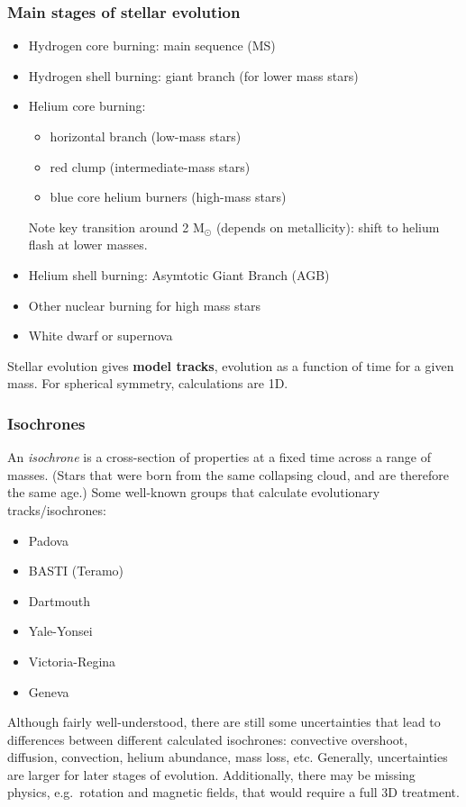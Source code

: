 \documentclass{article}
\newcommand{\mynotes}[1]{\textcolor{cadmiumorange}{#1}}
\begin{document}
\subsubsection{Main stages of stellar evolution}
\begin{itemize}
    \item Hydrogen core burning: main sequence (MS)
    \item Hydrogen shell burning: giant branch (for lower mass
        stars)
    \item Helium core burning:
        \begin{itemize}
            \item horizontal branch (low-mass stars)
            \item red clump (intermediate-mass stars)
            \item blue core helium burners (high-mass stars)
        \end{itemize}
        Note key transition around 2 M$_{\odot}$
        (depends on metallicity): shift to helium
        flash at lower masses.
    \item Helium shell burning: Asymtotic Giant Branch (AGB)
    \item Other nuclear burning for high mass stars
    \item White dwarf or supernova
\end{itemize}
Stellar evolution gives \textbf{model tracks}, evolution as a function of
time for a given mass. For spherical symmetry, calculations are 1D.

\subsubsection{Isochrones}
An \textit{isochrone} is a cross-section of properties at a
fixed time across a range of masses.
\mynotes{(Stars that were born from the same collapsing cloud, and are therefore
the same age.)}
Some well-known groups that calculate evolutionary tracks/isochrones:
\begin{itemize}
    \item Padova
    \item BASTI (Teramo)
    \item Dartmouth
    \item Yale-Yonsei
    \item Victoria-Regina
    \item Geneva
\end{itemize}

Although fairly well-understood, there are still some
uncertainties that lead to differences between different
calculated isochrones: convective overshoot, diffusion, convection,
helium abundance, mass loss, etc. Generally, uncertainties are larger
for later stages of evolution. Additionally, there may be missing
physics, e.g.\ rotation and magnetic fields, that would require a full
3D treatment.
\end{document}
